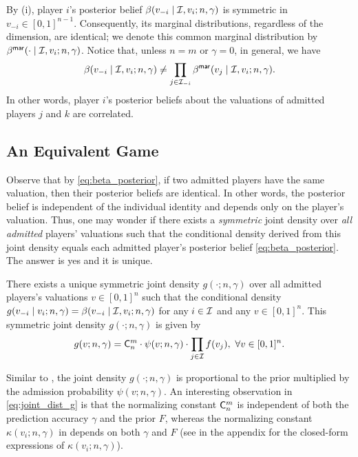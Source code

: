 By  (i), player $i$'s posterior belief $\beta(v_{-i}\mid \mathcal{I},v_i;n,\gamma)$ is symmetric in $v_{-i}\in [0,1]^{n-1}$. Consequently, its marginal distributions, regardless of the dimension, are identical; we denote this common marginal distribution by $\beta^{\mathsf{mar}}(\cdot \mid \mathcal{I},v_i;n,\gamma)$. Notice that, unless $n=m$ or $\gamma=0$, in general, we have
\begin{align*}
\beta(v_{-i}\mid \mathcal{I},v_i;n,\gamma) \neq \prod_{j\in \mathcal{I}_{-i}}\beta^{\mathsf{mar}}(v_j\mid \mathcal{I},v_i;n,\gamma).
\end{align*}
In other words, player $i$'s posterior beliefs about the valuations of admitted players $j$ and $k$ are correlated.







\subsection{An Equivalent Game}
\label{subsec:equivalent_game}

Observe that by \eqref{eq:beta_posterior}, if two admitted players have the same valuation, then their posterior beliefs are identical. In other words, the posterior belief is independent of the individual identity and depends only on the player's valuation. Thus, one may wonder if there exists a \textit{symmetric} joint density over \textit{all admitted} players' valuations such that the conditional density derived from this joint density equals each admitted player's posterior belief \eqref{eq:beta_posterior}.
The answer is yes and it is unique.


\begin{lemma}
\label{lem:joint_dis_g}
There exists a unique symmetric joint density $g(\cdot;n,\gamma)$ over all admitted players's valuations $v\in[0,1]^n$ such that the conditional density $g(v_{-i}\mid v_i;n,\gamma)=\beta(v_{-i}\mid \mathcal{I},v_i;n,\gamma)$ for any $i\in \mathcal{I}$ and any $v\in [0,1]^n$.
This symmetric joint density $g(\cdot ;n,\gamma)$ is given by
\begin{align}
\label{eq:joint_dist_g}
 g(v;n,\gamma) = \mathsf{C}^m_n\cdot \psi(v;n,\gamma)
 \cdot \prod_{j\in\mathcal{I}} f(v_j),~ \forall v\in [0,1]^n
 .   
\end{align}
\end{lemma}



Similar to , the joint density $g(\cdot;n,\gamma)$ is proportional to the prior multiplied by the admission probability $\psi(v;n,\gamma)$. An interesting observation in \eqref{eq:joint_dist_g} is that the normalizing constant $\mathsf{C}^m_n$ is independent of both the prediction accuracy $\gamma$ and the prior $F$, whereas the normalizing constant $\kappa(v_i;n,\gamma)$ in  depends on both $\gamma$ and $F$ (see  in the appendix for the closed-form expressions of $\kappa(v_i;n,\gamma)$).

